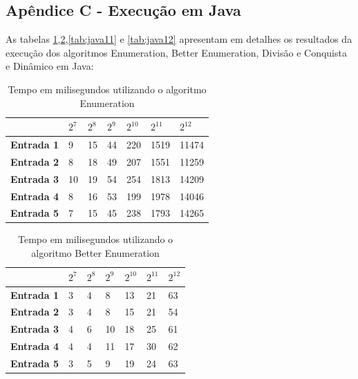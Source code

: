 \documentclass[
	12pt,				%
	oneside,   	        %
	a4paper,			%
	english,			%
	french,				%
	spanish,			%
	brazil,				%
	]{pacotes/abntex2}
\begin{document}
\begin{apendicesenv}

\section*{Apêndice C - Execução em Java}

As tabelas \ref{tab:java9},\ref{tab:java10},\ref{tab:java11} e \ref{tab:java12} apresentam em detalhes os resultados da execução dos
algoritmos Enumeration, Better Enumeration, Divisão e Conquista e Dinâmico em Java:

\begin{table}[!htb]
\centering
\caption{Tempo em milisegundos utilizando o algoritmo Enumeration}
\label{tab:java9}
\footnotesize   %
\begin{tabular}{l|llllll}
\toprule
& \textbf{$2^7$} & \textbf{$2^8$} & \textbf{$2^9$} & \textbf{$2^{10}$} & \textbf{$2^{11}$} & \textbf{$2^{12}$}\\ 
\midrule
\textbf{Entrada 1} & 9 & 15 & 44 & 220 & 1519 & 11474\\
\textbf{Entrada 2} & 8 & 18 & 49 & 207 & 1551 & 11259\\
\textbf{Entrada 3} & 10 & 19 & 54 & 254 & 1813 & 14209\\
\textbf{Entrada 4} & 8 & 16 & 53 & 199 & 1978 & 14046\\
\textbf{Entrada 5} & 7 & 15 & 45 & 238 & 1793 & 14265\\
 \bottomrule
\end{tabular}
\end{table}


\begin{table}[!htb]
\centering
\caption{Tempo em milisegundos utilizando o algoritmo Better Enumeration}
\label{tab:java10}
\footnotesize   %
\begin{tabular}{l|llllll}
\toprule
& \textbf{$2^7$} & \textbf{$2^8$} & \textbf{$2^9$} & \textbf{$2^{10}$} & \textbf{$2^{11}$} & \textbf{$2^{12}$}\\ 
\midrule
\textbf{Entrada 1} & 3 & 4 & 8 & 13 & 21 & 63\\
\textbf{Entrada 2} & 3 & 4 & 8 & 15 & 21 & 54\\
\textbf{Entrada 3} & 4 & 6 & 10 & 18 & 25 & 61\\
\textbf{Entrada 4} & 4 & 4 & 11 & 17 & 30 & 62\\
\textbf{Entrada 5} & 3 & 5 & 9 & 19 & 24 & 63\\
 \bottomrule
\end{tabular}
\end{table}


\end{apendicesenv}
\end{document}
